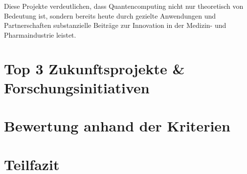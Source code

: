 Diese Projekte verdeutlichen, dass Quantencomputing nicht nur theoretisch von Bedeutung ist, sondern bereits heute durch gezielte Anwendungen und Partnerschaften substanzielle Beiträge zur Innovation in der Medizin- und Pharmaindustrie leistet.












\section{Top 3 Zukunftsprojekte \& Forschungsinitiativen}


\section{Bewertung anhand der Kriterien}


\section{Teilfazit}


\printbibliography
